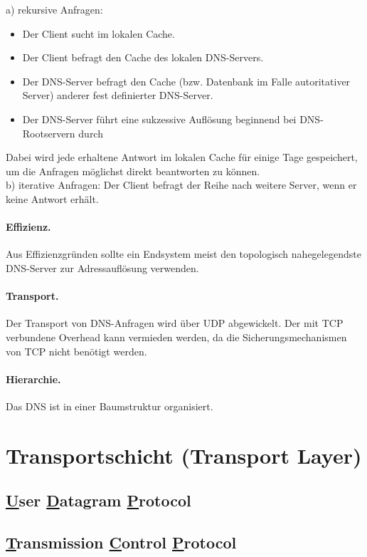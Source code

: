 \documentclass[]{scrartcl}
\begin{document}
a) rekursive Anfragen: 
\begin{itemize} 
\item Der Client sucht im lokalen Cache.
\item Der Client befragt den Cache des lokalen DNS-Servers.
\item Der DNS-Server befragt den Cache (bzw. Datenbank im Falle autoritativer Server) anderer fest definierter DNS-Server.
\item Der DNS-Server f\"uhrt eine sukzessive Aufl\"osung beginnend bei DNS-Rootservern durch
\end{itemize}
Dabei wird jede erhaltene Antwort im lokalen Cache f\"ur einige Tage gespeichert, um die Anfragen m\"oglichst direkt beantworten zu k\"onnen. \\
b) iterative Anfragen: Der Client befragt der Reihe nach weitere Server, wenn er keine Antwort erh\"alt.

\paragraph{Effizienz.} Aus Effizienzgr\"unden sollte ein Endsystem meist den topologisch nahegelegendste DNS-Server zur Adressaufl\"osung verwenden.

\paragraph{Transport.} Der Transport von DNS-Anfragen wird \"uber UDP abgewickelt. Der mit TCP verbundene Overhead kann vermieden werden, da die Sicherungsmechanismen von TCP nicht ben\"otigt werden.

\paragraph{Hierarchie.} Das DNS ist in einer Baumstruktur organisiert.


\section{Transportschicht (Transport Layer)}


\subsection{\underline{U}ser \underline{D}atagram \underline{P}rotocol}

\subsection{\underline{T}ransmission \underline{C}ontrol \underline{P}rotocol}
\end{document}
